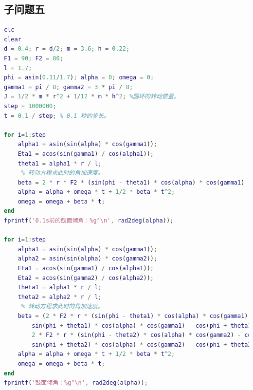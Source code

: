 \documentclass{cumcm}
\begin{document}
\subsection{子问题五}
\begin{lstlisting}[language=matlab]
clc
clear
d = 0.4; r = d/2; m = 3.6; h = 0.22;
F1 = 90; F2 = 80;
l = 1.7;
phi = asin(0.11/1.7); alpha = 0; omega = 0;
gamma1 = pi / 8; gamma2 = 3 * pi / 8;
J = 1/2 * m * r^2 + 1/12 * m * h^2; %圆环的转动惯量。
step = 1000000;
t = 0.1 / step; % 0.1 秒的步长。

for i=1:step
    alpha1 = asin(sin(alpha) * cos(gamma1));
    Eta1 = acos(sin(gamma1) / cos(alpha1));
    theta1 = alpha1 * r / l;
     % 转动方程求此时的角加速度。
    beta = 2 * r * F2 * (sin(phi - theta1) * cos(alpha) * cos(gamma1) - cos(phi - theta1) * sin(alpha1) * sin(Eta1)) / J;
    alpha = alpha + omega * t + 1/2 * beta * t^2;
    omega = omega + beta * t;
end
fprintf('0.1s前的鼓面倾角：%g°\n', rad2deg(alpha));

for i=1:step
    alpha1 = asin(sin(alpha) * cos(gamma1));
    alpha2 = asin(sin(alpha) * cos(gamma2));
    Eta1 = acos(sin(gamma1) / cos(alpha1));
    Eta2 = acos(sin(gamma2) / cos(alpha2));
    theta1 = alpha1 * r / l;
    theta2 = alpha2 * r / l;
     % 转动方程求此时的角加速度。
    beta = (2 * F2 * r * (sin(phi - theta1) * cos(alpha) * cos(gamma1) - cos(phi - theta1) * sin(alpha1) * sin(Eta1) - ...
        sin(phi + theta1) * cos(alpha) * cos(gamma1) - cos(phi + theta1) * sin(alpha1) * sin(Eta1)) + ...
        2 * F2 * r * (sin(phi - theta2) * cos(alpha) * cos(gamma2) - cos(phi - theta2) * sin(alpha2) * sin(Eta2) - ...
        sin(phi + theta2) * cos(alpha) * cos(gamma2) - cos(phi + theta2) * sin(alpha2) * sin(Eta2))) / J;
    alpha = alpha + omega * t + 1/2 * beta * t^2;
    omega = omega + beta * t;
end
fprintf('鼓面倾角：%g°\n', rad2deg(alpha));
\end{lstlisting}
\end{document}
